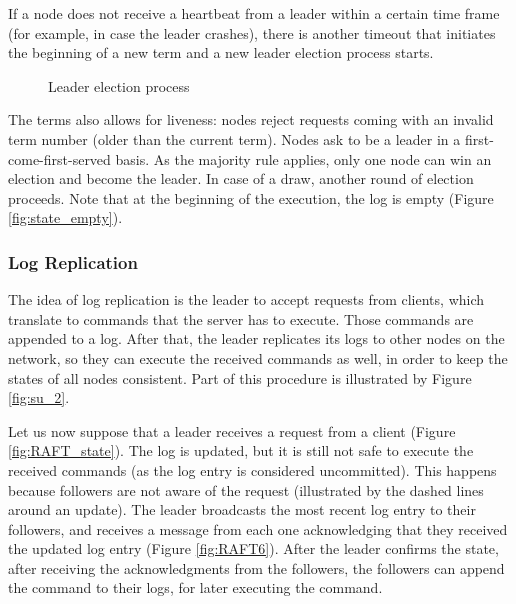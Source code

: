\documentclass[12pt,a4paper]{article}
\begin{document}
If a node does not receive a heartbeat from a leader within a certain time frame (for example, in case the leader crashes), there is another timeout that initiates the beginning of a new term and a new leader election process starts.

\begin{figure}
    \centering
    \qquad
    \caption{Leader election process}%
    \label{fig:le_1}%
\end{figure}

The terms also allows for liveness: nodes reject requests coming with an invalid term number (older than the current term). Nodes ask to be a leader in a  first-come-first-served basis. As the majority rule applies, only one node can win an election and become the leader. In case of a draw, another round of election proceeds. Note that at the beginning of the execution, the log is empty (Figure \ref{fig:state_empty}).





\subsubsection{Log Replication}
The idea of log replication is the leader to accept requests from clients, which translate to commands that the server has to execute. Those commands are appended to a log. After that, the leader replicates its logs to other nodes on the network, so they can execute the received commands as well, in order to keep the states of all nodes consistent. Part of this procedure is illustrated by Figure \ref{fig:su_2}. 

Let us now suppose that a leader receives a request from a client (Figure \ref{fig:RAFT_state}). The log is updated, but it is still not safe to execute the received commands (as the log entry is considered uncommitted). This happens because followers are not aware of the request (illustrated by the dashed lines around an update). The leader broadcasts the most recent log entry to their followers, and receives a message from each one acknowledging that they received the updated log entry (Figure \ref{fig:RAFT6}). After the leader confirms the state, after receiving the acknowledgments from the followers, the followers can append the command to their logs, for later executing the command. 
\end{document}
